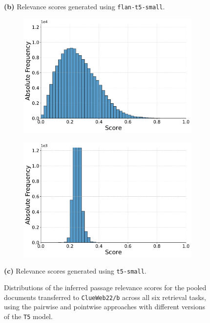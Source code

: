 \begin{figure}[t!]
    \vspace{-0.5cm}
    \textbf{(b)} Relevance scores generated using \texttt{flan-t5-small}.
    \vspace{0.5cm}

    \begin{subfigure}[b]{0.49\textwidth}
        \centering
        \includegraphics[width=\textwidth]{graphics/seaborn/pairwise_cw22_score_distribution_t5-small.pdf}
        \label{fig:pairwise_t5-small}
    \end{subfigure}
    \hfill
    \begin{subfigure}[b]{0.49\textwidth}
        \centering
        \includegraphics[width=\textwidth]{graphics/seaborn/pointwise_cw22_score_distribution_t5-small.pdf}
        \label{fig:pointwise_t5-small}
    \end{subfigure}

    \vspace{-0.5cm}
    \textbf{(c)} Relevance scores generated using \texttt{t5-small}.
    \vspace{0.5cm}

    \caption{Distributions of the inferred passage relevance scores for the pooled documents transferred to \texttt{ClueWeb22/b} across all six retrieval tasks, using the pairwise and pointwise approaches with different versions of the \texttt{T5} model.}
    \label{fig:score-distributions-cw22}
\end{figure}